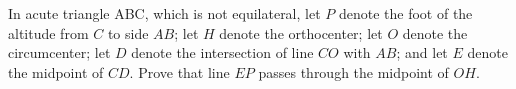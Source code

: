 In acute triangle ABC, which is not equilateral, let $P$ denote the foot of the altitude from $C$ to side $AB$; let $H$ denote the orthocenter; let $O$ denote the circumcenter; let $D$ denote the intersection of line $CO$ with $AB$; and let $E$ denote the midpoint of $CD$. Prove that line $EP$ passes through the midpoint of $OH$.